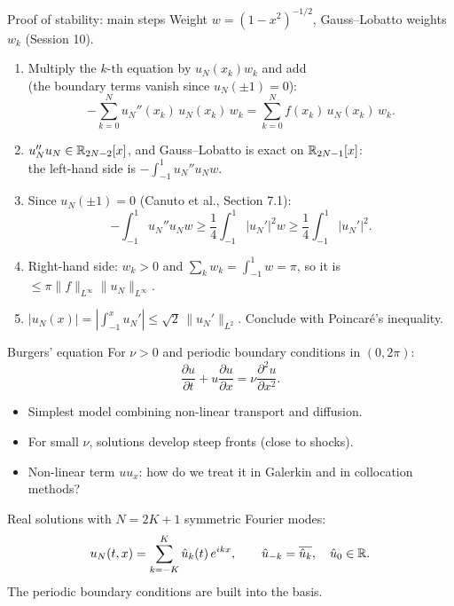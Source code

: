 \begin{frame}{Proof of stability: main steps}
    \small
    Weight $w = (1-x^2)^{-1/2}$, Gauss--Lobatto weights $w_k$ (Session 10).
    \begin{enumerate}
        \item Multiply the $k$-th equation by $u_N(x_k) w_k$ and add\\ (the boundary terms vanish since $u_N(\pm1) = 0$):
              \[
                  -\sum_{k=0}^N u_N''(x_k)\, u_N(x_k)\, w_k = \sum_{k=0}^N f(x_k)\, u_N(x_k)\, w_k .
              \]
        \item $u_N'' u_N \in {\mathbb R}_{2N-2}[x]$, and Gauss--Lobatto is exact on ${\mathbb R}_{2N-1}[x]$:\\ the left-hand side is $-\int_{-1}^1 u_N'' u_N w$.
        \item Since $u_N(\pm1) = 0$ (Canuto et al., Section 7.1):
              \[
                  -\int_{-1}^1 u_N'' u_N w \ge \frac 14 \int_{-1}^1 |u_N'|^2 w \ge \frac14 \int_{-1}^1 |u_N'|^2 .
              \]
        \item Right-hand side: $w_k > 0$ and $\sum_k w_k = \int_{-1}^1 w = \pi$, so it is $\le \pi \|f\|_{L^\infty}\|u_N\|_{L^\infty}$.
        \item $|u_N(x)| = |\int_{-1}^x u_N'| \le \sqrt 2\, \|u_N'\|_{L^2}$. Conclude with Poincaré's inequality.
    \end{enumerate}
\end{frame}

\begin{frame}{Burgers' equation}
    For $\nu > 0$ and periodic boundary conditions in $(0,2\pi)$:
    \[
        \frac{\partial u}{\partial t} + u \frac{\partial u}{\partial x} = \nu \frac{\partial^2 u}{\partial x^2}.
    \]
    \begin{itemize}
        \item Simplest model combining non-linear transport and diffusion.
        \item For small $\nu$, solutions develop steep fronts (close to shocks).
        \item Non-linear term $u u_x$: how do we treat it in Galerkin and in collocation methods?
    \end{itemize}
    \bigskip
    Real solutions with $N = 2K+1$ symmetric Fourier modes:
    \[
        u_N(t,x) = \sum_{k=-K}^K \hat u_k(t)\, e^{ikx}, \qquad \hat u_{-k} = \overline{\hat u_k}, \quad \hat u_0 \in {\mathbb R} .
    \]
    The periodic boundary conditions are built into the basis.
\end{frame}

